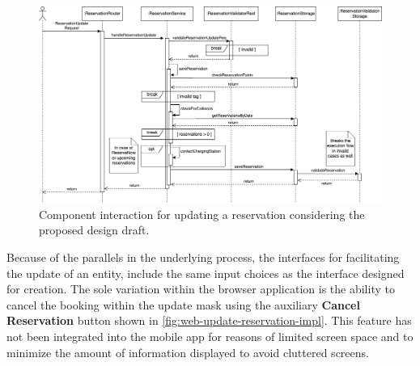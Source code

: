 \newpage

\begin{figure}[h]
    \centering
    \includegraphics[scale=0.4]{resources/images/main/6_implementation/processes/ReservationUpdate.png}
    \caption{Component interaction for updating a reservation considering the proposed design draft.}
    \label{fig:update-reservation-seqflow}
\end{figure}

\noindent Because of the parallels in the underlying process, the interfaces for facilitating the update of an entity, include the same input choices as the interface designed for creation.
The sole variation within the browser application is the ability to cancel the booking within the update mask using the auxiliary \textbf{Cancel Reservation} button shown in \ref{fig:web-update-reservation-impl}. 
This feature has not been integrated into the mobile app for reasons of limited screen space and to minimize the amount of information displayed to avoid cluttered screens.

